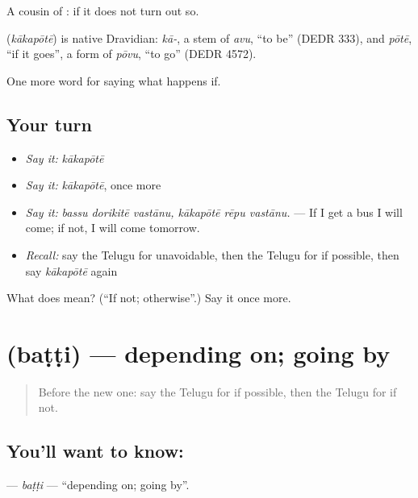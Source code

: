 A cousin of : if it does not turn out so.

\begin{cousinweb}
\textbf{} (\emph{kākapōtē}) is native Dravidian: \emph{kā-}, a stem of \emph{avu}, \textquotedblleft{}to be\textquotedblright{} (DEDR 333), and \emph{pōtē}, \textquotedblleft{}if it goes\textquotedblright{}, a form of \emph{pōvu}, \textquotedblleft{}to go\textquotedblright{} (DEDR 4572).
\end{cousinweb}

\begin{grammarlens}[title={What you've built}]
One more word for saying what happens if.
\end{grammarlens}

\subsection*{Your turn}
\begin{itemize}
\raggedright
  \item \emph{Say it:} \emph{kākapōtē}
  \item \emph{Say it:} \emph{kākapōtē}, once more
  \item \emph{Say it:} \emph{bassu dorikitē vastānu, kākapōtē rēpu vastānu.} — If I get a bus I will come; if not, I will come tomorrow.
  \item \emph{Recall:} say the Telugu for unavoidable, then the Telugu for if possible, then say \emph{kākapōtē} again
\end{itemize}

\begin{tcolorbox}[breakable,colback=teal!4,colframe=teal!35!black,title={Before you move on}]
What does  mean? (\textquotedblleft{}If not; otherwise\textquotedblright{}.) Say it once more.
\end{tcolorbox}
\section[\texorpdfstring{\te{బట్టి} (baṭṭi)}{బట్టి (baṭṭi)}]{ (baṭṭi) — depending on; going by}

\label{lesson:TE-C419-batti}



\begin{quote}
Before the new one: say the Telugu for if possible, then the Telugu for if not.
\end{quote}

\subsection*{You'll want to know: }
\textbf{} — \emph{baṭṭi} — \textquotedblleft{}depending on; going by\textquotedblright{}.

